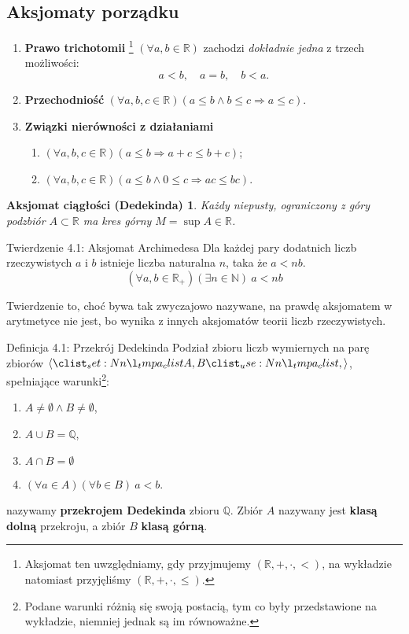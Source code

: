 \documentclass{article}
\newtheorem*{dedekind}{{\color{darkred} Aksjomat ciągłości (Dedekinda)}}
\newcommand{\R}{\mathbb{R}}
\newcommand{\N}{\mathbb{N}}
\newcommand{\Q}{\mathbb{Q}}
\newcommand{\imp}{\Rightarrow}
\begin{document}
\subsection*{{\color{darkred} Aksjomaty porządku}} 
\begin{enumerate}[label=(\arabic*)]
    \item \textbf{Prawo trichotomii}
    \footnote{Aksjomat ten uwzględniamy, gdy przyjmujemy $(\R,+,\cdot,<)$,
    na wykładzie natomiast przyjęliśmy $(\R,+,\cdot,\le)$.}
    \((\forall a,b\in\R)\) zachodzi \emph{dokładnie jedna} z trzech możliwości:
    \begin{equation*}
        a<b,\quad a=b,\quad b<a.
    \end{equation*}
    \item \textbf{Przechodniość}
    \((\forall a,b,c\in\R)(a\le b\land b\le c\imp a\le c)\).
    \item \textbf{Związki nierówności z działaniami}
    \begin{enumerate}
        \item \((\forall a,b,c\in\R)(a\le b\imp a+c\le b+c)\);
        \item \((\forall a,b,c\in\R)(a\le b\land 0\le c\imp ac\le bc)\).
    \end{enumerate}
\end{enumerate} \smallskip

\begin{dedekind}
    \textit{Każdy niepusty, ograniczony z góry podzbiór} $A\subset\R$
    \textit{ma kres górny} $M=\sup{A}\in\R$.
\end{dedekind} \pagebreak

\begin{twier}{Twierdzenie 4.1: Aksjomat Archimedesa}
    Dla każdej pary dodatnich liczb rzeczywistych $a$ i $b$ istnieje liczba
    naturalna $n$, taka że $a<nb$.
\begin{equation*}
    (\forall a,b\in\R_+)(\exists n\in\N)\ a<nb
\end{equation*}
\end{twier}

Twierdzenie to, choć bywa tak zwyczajowo nazywane,
na prawdę aksjomatem w arytmetyce nie jest,
bo wynika z innych aksjomatów teorii liczb rzeczywistych. 

\begin{defr}{Definicja 4.1: Przekrój Dedekinda}
Podział zbioru liczb wymiernych na parę zbiorów $\op{A,B}$, spełniające
warunki\footnote{Podane warunki różnią się swoją postacią,
tym co były przedstawione na wykładzie, niemniej jednak są im równoważne.}:
\begin{enumerate}[label=(\arabic*)]
    \item $A\neq \emptyset \land B\neq \emptyset$,
    \item $A\cup B=\Q$,
    \item $A\cap B=\emptyset$
    \item $(\forall a\in A)(\forall b\in B)\ a<b$.
\end{enumerate}
nazywamy \textbf{przekrojem Dedekinda} zbioru $\Q$. Zbiór $A$
nazywany jest \textbf{klasą dolną} przekroju, a zbiór $B$
\textbf{klasą górną}.
\end{defr}
\end{document}
